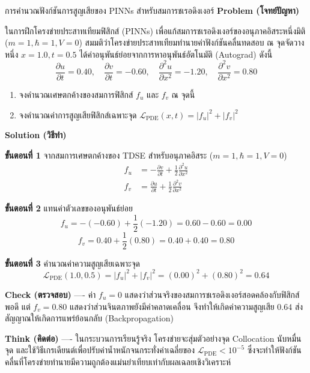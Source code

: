 \begin{psctbox}{การคำนวณฟังก์ชันการสูญเสียของ PINNs สำหรับสมการชเรอดิงเงอร์}
\textbf{Problem (โจทย์ปัญหา)}

ในการฝึกโครงข่ายประสาทเทียมฟิสิกส์ (PINNs) เพื่อแก้สมการชเรอดิงเงอร์ของอนุภาคอิสระหนึ่งมิติ ($m = 1, \hbar = 1, V = 0$) สมมติว่าโครงข่ายประสาทเทียมทำนายค่าฟังก์ชันคลื่นทดสอบ ณ จุดจัดวางหนึ่ง $x = 1.0, t = 0.5$ ได้ค่าอนุพันธ์ย่อยจากการหาอนุพันธ์อัตโนมัติ (Autograd) ดังนี้
\begin{equation*}
\frac{\partial u}{\partial t} = 0.40, \quad \frac{\partial v}{\partial t} = -0.60, \quad \frac{\partial^2 u}{\partial x^2} = -1.20, \quad \frac{\partial^2 v}{\partial x^2} = 0.80
\end{equation*}
\begin{enumerate}
    \item จงคำนวณเศษตกค้างของสมการฟิสิกส์ $f_u$ และ $f_v$ ณ จุดนี้
    \item จงคำนวณค่าการสูญเสียฟิสิกส์เฉพาะจุด $\mathcal{L}_{\text{PDE}}(x, t) = |f_u|^2 + |f_v|^2$
\end{enumerate}

\textbf{Solution (วิธีทำ)}

\textbf{ขั้นตอนที่ 1} จากสมการเศษตกค้างของ TDSE สำหรับอนุภาคอิสระ ($m = 1, \hbar = 1, V = 0$)
\begin{align*}
f_u &= -\frac{\partial v}{\partial t} + \frac{1}{2}\frac{\partial^2 u}{\partial x^2} \\
f_v &= \frac{\partial u}{\partial t} + \frac{1}{2}\frac{\partial^2 v}{\partial x^2}
\end{align*}

\textbf{ขั้นตอนที่ 2} แทนค่าตัวเลขของอนุพันธ์ย่อย
\begin{equation*}
f_u = -(-0.60) + \frac{1}{2}(-1.20) = 0.60 - 0.60 = 0.00
\end{equation*}
\begin{equation*}
f_v = 0.40 + \frac{1}{2}(0.80) = 0.40 + 0.40 = 0.80
\end{equation*}

\textbf{ขั้นตอนที่ 3} คำนวณค่าความสูญเสียเฉพาะจุด
\begin{equation*}
\mathcal{L}_{\text{PDE}}(1.0, 0.5) = |f_u|^2 + |f_v|^2 = (0.00)^2 + (0.80)^2 = 0.64
\end{equation*}

\textbf{Check (ตรวจสอบ)} ---- ค่า $f_u = 0$ แสดงว่าส่วนจริงของสมการชเรอดิงเงอร์สอดคล้องกับฟิสิกส์พอดี แต่ $f_v = 0.80$ แสดงว่าส่วนจินตภาพยังมีค่าคลาดเคลื่อน จึงทำให้เกิดค่าความสูญเสีย $0.64$ ส่งสัญญาณให้เกิดการแพร่ย้อนกลับ (Backpropagation)

\textbf{Think (คิดต่อ)} ---- ในกระบวนการเรียนรู้จริง โครงข่ายจะสุ่มตัวอย่างจุด Collocation นับหมื่นจุด และใช้วิธีเกรเดียนต์เพื่อปรับค่าน้ำหนักจนกระทั่งค่าเฉลี่ยของ $\mathcal{L}_{\text{PDE}} < 10^{-5}$ ซึ่งจะทำให้ฟังก์ชันคลื่นที่โครงข่ายทำนายมีความถูกต้องแม่นยำเทียบเท่ากับผลเฉลยเชิงวิเคราะห์
\end{psctbox}

